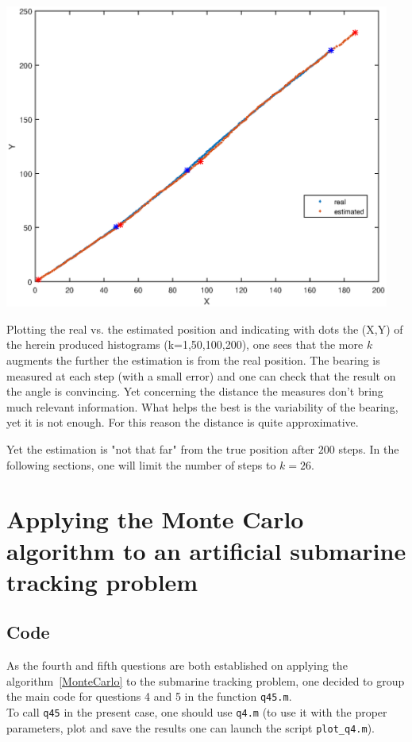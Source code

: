 \documentclass[english,DIV=13]{scrreprt}
\begin{document}
\begin{center}
	\begin{minipage}{.6\textwidth}
		\includegraphics[width=0.95\textwidth]{img/q3_path.eps}
	\end{minipage}%
	\begin{minipage}{.4\textwidth}
		Plotting the real vs. the estimated position and indicating with dots the (X,Y) of the 
		herein produced histograms (k=1,50,100,200), one sees that the more $k$ augments
		the further the estimation is from the real position. The bearing is measured at each step (with a small error) and
		one can check that the result on the angle is convincing. Yet concerning the distance the measures don't bring
		much relevant information. What helps the best is the variability of the bearing, yet it is not enough. For this
		reason the distance is quite approximative.
	\end{minipage}
\end{center}
 Yet the estimation is "not that far" from the true position after $200$ steps.
 In the following sections, one will limit the number of steps to $k=26$. 
\chapter{Applying the Monte Carlo algorithm to an artificial submarine 
tracking problem}
\section*{Code}

As the fourth and fifth questions are both established on applying the algorithm~\ref{MonteCarlo}
to the submarine tracking problem, one decided to group the main code for questions 4 and 5
in the function \texttt{q45.m}.\\

To call \texttt{q45} in the present case, one should use \texttt{q4.m} (to use it with the proper parameters,
plot and save the results one can launch the script \texttt{plot\_q4.m}).\\

\end{document}
